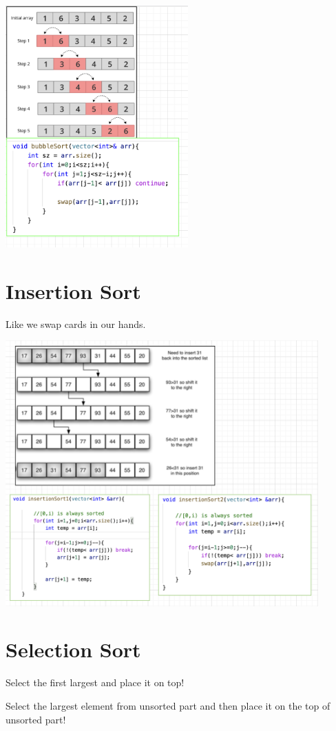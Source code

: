  \includegraphics[width=7cm]{resources/sorting-bubble-sort.png}

 \section{Insertion Sort}
 Like we swap cards in our hands.

 \includegraphics[width=12cm]{resources/sorting-insertion-sort.png}
 

 \section{Selection Sort}
 Select the first largest and place it on top!
 
 Select the largest element from unsorted part and then place it on the top of unsorted part!


